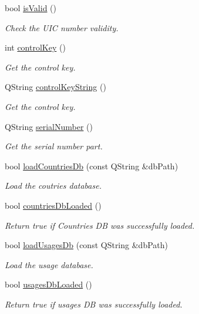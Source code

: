 \begin{DoxyCompactItemize}
bool \hyperlink{classmdt_uic_number_aac3c9e1adb6f9646216b4327645a621a}{is\-Valid} ()
\begin{DoxyCompactList}\small\item\em Check the U\-I\-C number validity. \end{DoxyCompactList}\item 
int \hyperlink{classmdt_uic_number_acd5013109fc4b953023333ac1382edd6}{control\-Key} ()
\begin{DoxyCompactList}\small\item\em Get the control key. \end{DoxyCompactList}\item 
Q\-String \hyperlink{classmdt_uic_number_a7a66af4f41cfaf69d53b9db66f465c27}{control\-Key\-String} ()
\begin{DoxyCompactList}\small\item\em Get the control key. \end{DoxyCompactList}\item 
Q\-String \hyperlink{classmdt_uic_number_ad4fbefb268327d15c2d39d2a17f45180}{serial\-Number} ()
\begin{DoxyCompactList}\small\item\em Get the serial number part. \end{DoxyCompactList}\item 
bool \hyperlink{classmdt_uic_number_ad7bb1405db0de8f1d247fa5a7bdb19ce}{load\-Countries\-Db} (const Q\-String \&db\-Path)
\begin{DoxyCompactList}\small\item\em Load the coutries database. \end{DoxyCompactList}\item 
bool \hyperlink{classmdt_uic_number_a36eec09823de2d9848e9f7b8135fa59d}{countries\-Db\-Loaded} ()
\begin{DoxyCompactList}\small\item\em Return true if Countries D\-B was successfully loaded. \end{DoxyCompactList}\item 
bool \hyperlink{classmdt_uic_number_af496e1fb75f696258287754fe2607561}{load\-Usages\-Db} (const Q\-String \&db\-Path)
\begin{DoxyCompactList}\small\item\em Load the usage database. \end{DoxyCompactList}\item 
bool \hyperlink{classmdt_uic_number_a2090c7d80c75d1db42d271f82ff8f598}{usages\-Db\-Loaded} ()
\begin{DoxyCompactList}\small\item\em Return true if usages D\-B was successfully loaded. \end{DoxyCompactList}\item 

\end{DoxyCompactItemize}
